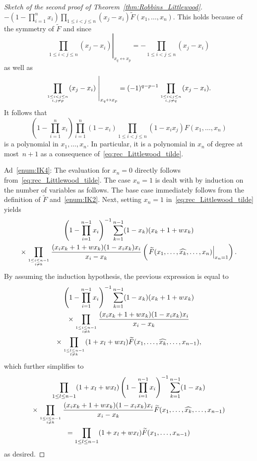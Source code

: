 \documentclass[ALCO, Unicode]{cedram}
\newcommand\myatop[2]{\genfrac{}{}{0pt}{}{#1}{#2}}
\begin{document}
\begin{proof}[Sketch of the second proof of Theorem~\ref{thm:Robbins_Littlewood}]
		$-(1-\prod_{i=1}^n x_i) \prod_{1 \le i < j \le n} (x_j-x_i) \widetilde{F}(x_1,\dots,x_n)$. This holds because of the symmetry of $\widetilde{F}$ and since
		\begin{equation*}
			\left.\prod_{1 \le i < j \le n} (x_j-x_i) \right\vert_{x_q \leftrightarrow x_p}= - \prod_{1 \le i < j \le n} (x_j-x_i)
		\end{equation*}
		as well as
		\begin{equation*}
			\prod_{\myatop{1 \le i < j \le n}{i,j \neq p}} (x_j-x_i) \left.\vphantom{\prod_{1 \le i < j \le n} (x_j-x_i)}\right\vert_{x_q \leftrightarrow x_p}= (-1)^{q-p-1} \prod_{\myatop{1 \le i < j \le n}{i,j \neq q}} (x_j-x_i).
		\end{equation*}
		It follows that
		\begin{equation*}
			\left(1-\prod_{i=1}^n x_i \right) \prod_{i=1}^{n} (1-x_i) \prod_{1 \le i < j \le n} (1-x_i x_j)F(x_1,\dots,x_n)
		\end{equation*}
		is a polynomial in $x_1,\dots,x_n$. In particular, it is a polynomial in $x_n$ of degree at most~$n+1$ as a consequence of~\eqref{eq:rec_Littlewood_tilde}.
		
		Ad~\ref{enum:IK4}: The evaluation for $x_n=0$ directly follows from~\eqref{eq:rec_Littlewood_tilde}. The case \mbox{$x_n=1$} is dealt with by induction on the number of variables as follows. The base case immediately follows from the definition of $\widetilde{F}$ and~\ref{enum:IK2}. Next, setting $x_n=1$ in~\eqref{eq:rec_Littlewood_tilde} yields
		\begin{multline*}
			\left(1-\prod_{i=1}^{n-1} x_i \right)^{-1} \sum\limits_{k=1}^{n-1} (1-x_k) (x_k+1+w x_k) \\
			\times \prod\limits_{\myatop{1 \le i \le n-1}{i \neq k}} \frac{(x_i x_k+1+w x_k) (1-x_i x_k) x_i}{x_i-x_k}
			\left(\left.\widetilde{F}(x_1,\ldots,\widehat{x_k},\ldots,x_n)\right\vert_{x_n=1}\right).
		\end{multline*}
		By assuming the induction hypothesis, the previous expression is equal to
		\begin{multline*}
			\left(1-\prod_{i=1}^{n-1} x_i \right)^{-1} \sum\limits_{k=1}^{n-1} (1-x_k) (x_k+1+w x_k) \\
			\times \prod\limits_{\myatop{1 \le i \le n-1}{i \neq k}} \frac{(x_i x_k+1+w x_k) (1-x_i x_k) x_i}{x_i-x_k}\\
			\times \prod_{\myatop{1 \le l \le n-1}{l \neq k}} (1+x_l+w x_l) \widetilde{F}(x_1,\ldots,\widehat{x_k},\ldots,x_{n-1}),
		\end{multline*}
		which further simplifies to
		\begin{multline*}
			\prod_{1 \le l \le n-1} (1+x_l+w x_l) \left(1-\prod_{i=1}^{n-1} x_i \right)^{-1} \sum\limits_{k=1}^{n-1} (1-x_k) \\
			\times \prod\limits_{\myatop{1 \le i \le n-1}{i \neq k}} \frac{(x_i x_k+1+w x_k) (1-x_i x_k) x_i}{x_i-x_k}
			\widetilde{F}(x_1,\ldots,\widehat{x_k},\ldots,x_{n-1})\\
			=\prod_{1 \le l \le n-1} (1+x_l+w x_l) \widetilde{F}(x_1,\dots,x_{n-1})
		\end{multline*}
		as desired.
		

\end{proof}
\end{document}
